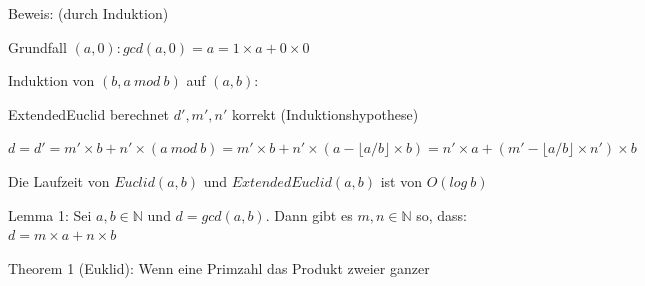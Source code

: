\documentclass[a4paper]{article}
\begin{document}
\begin{multicols}{3}
\begin{itemize*}
            \begin{itemize*}
                  \item Beweis: (durch Induktion)
                  \begin{itemize*}
                        \item Grundfall $(a,0): gcd(a, 0) = a = 1 \times a + 0 \times 0$
                        \item Induktion von $(b, a\ mod\ b)$ auf $(a, b)$:
                        \begin{itemize*}
                              \item ExtendedEuclid berechnet $d', m', n'$ korrekt (Induktionshypothese)
                              \item $d=d'=m'\times b+n'\times (a\ mod\ b)=m'\times b+n'\times (a-\lfloor a/b\rfloor\times b)=n'\times a+(m'-\lfloor a/b\rfloor\times n')\times b$
                        \end{itemize*}
                  \end{itemize*}
                  \item Die Laufzeit von $Euclid(a, b)$ und $ExtendedEuclid(a, b)$ ist von $O(log\ b)$
                  \item Lemma 1: Sei $a,b\in\mathbb{N}$ und $d=gcd(a,b)$. Dann gibt es $m,n\in\mathbb{N}$ so, dass: $d=m\times a+n \times b$
            \end{itemize*}
            \item Theorem 1 (Euklid): Wenn eine Primzahl das Produkt zweier ganzer

\end{itemize*}
\end{multicols}
\end{document}
